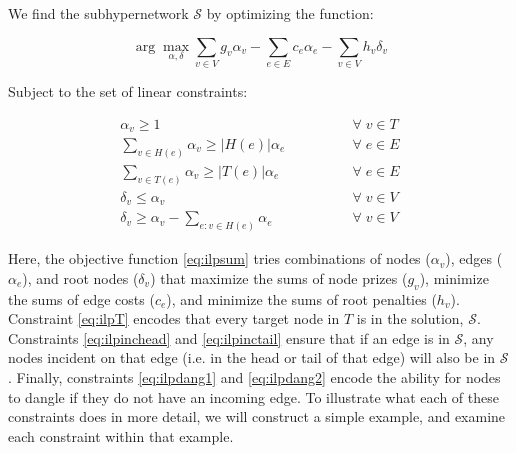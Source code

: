 \documentclass[12pt,twoside]{reedthesis}
\theoremstyle{definition}
\newcommand{\argmax}{\arg\!\max}
\begin{document}
We find the subhypernetwork $\mathcal{S}$ by optimizing the function:

\begin{equation} \label{eq:ilpsum}
 \argmax_{\alpha, \delta} \sum_{v \in V} g_v \alpha_v - \sum_{e \in E} c_e \alpha_e - \sum_{v \in V} h_v \delta_v
\end{equation}

Subject to the set of linear constraints:

\begin{align}
 \alpha_v \geq 1 \qquad\qquad &\forall\; v \in T\label{eq:ilpT}\\
 \sum_{v \in H(e)} \alpha_v \geq \lvert H(e)\rvert \alpha_e \qquad\qquad &\forall\; e \in E\label{eq:ilpinchead}\\
 \sum_{v \in T(e)} \alpha_v \geq \lvert T(e)\rvert \alpha_e\qquad\qquad &\forall\; e \in E\label{eq:ilpinctail}\\
 \delta_v \leq \alpha_v \qquad\qquad &\forall\; v \in V\label{eq:ilpdang1}\\
 \delta_v \geq \alpha_{v} - \sum_{e:v \in H(e)} \alpha_e \qquad\qquad &\forall\; v \in V\label{eq:ilpdang2}%
\end{align}%


Here, the objective function \eqref{eq:ilpsum} tries combinations of nodes ($\alpha_v$), edges ($\alpha_e$), and root nodes ($\delta_v$) that maximize the sums of node prizes ($g_v$), minimize the sums of edge costs ($c_e$), and minimize the sums of root penalties ($h_v$). Constraint \eqref{eq:ilpT} encodes that every target node in $T$ is in the solution, $\mathcal{S}$.  Constraints \eqref{eq:ilpinchead} and \eqref{eq:ilpinctail} ensure that if an edge is in $\mathcal{S}$, any nodes incident on that edge (i.e. in the head or tail of that edge) will also be in $\mathcal{S}$.  Finally, constraints \eqref{eq:ilpdang1} and \eqref{eq:ilpdang2} encode the ability for nodes to dangle if they do not have an incoming edge. To illustrate what each of these constraints does in more detail, we will construct a simple example, and examine each constraint within that example.\par
\end{document}
